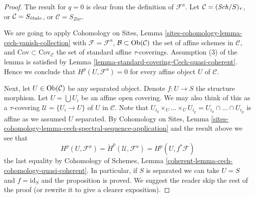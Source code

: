 \begin{proof}
The result for $q = 0$ is clear from the definition of $\mathcal{F}^a$.
Let $\mathcal{C} = (\mathit{Sch}/S)_\tau$, or $\mathcal{C} = S_{\acute{e}tale}$,
or $\mathcal{C} = S_{Zar}$.

\medskip\noindent
We are going to apply
Cohomology on Sites,
Lemma \ref{sites-cohomology-lemma-cech-vanish-collection}
with $\mathcal{F} = \mathcal{F}^a$,
$\mathcal{B} \subset \mathop{\mathrm{Ob}}\nolimits(\mathcal{C})$ the set of affine schemes
in $\mathcal{C}$, and $\text{Cov} \subset \text{Cov}_\mathcal{C}$ the
set of standard affine $\tau$-coverings. Assumption (3) of
the lemma is satisfied by
Lemma \ref{lemma-standard-covering-Cech-quasi-coherent}.
Hence we conclude that $H^p(U, \mathcal{F}^a) = 0$ for every
affine object $U$ of $\mathcal{C}$.

\medskip\noindent
Next, let $U \in \mathop{\mathrm{Ob}}\nolimits(\mathcal{C})$ be any separated object.
Denote $f : U \to S$ the structure morphism.
Let $U = \bigcup U_i$ be an affine open covering.
We may also think of this as a $\tau$-covering
$\mathcal{U} = \{U_i \to U\}$ of $U$ in $\mathcal{C}$.
Note that
$U_{i_0} \times_U \ldots \times_U U_{i_p} =
U_{i_0} \cap \ldots \cap U_{i_p}$ is affine as we assumed $U$ separated.
By
Cohomology on Sites, Lemma
\ref{sites-cohomology-lemma-cech-spectral-sequence-application}
and the result above we see that
$$
H^p(U, \mathcal{F}^a) = \check{H}^p(\mathcal{U}, \mathcal{F}^a)
= H^p(U, f^*\mathcal{F})
$$
the last equality by
Cohomology of Schemes, Lemma
\ref{coherent-lemma-cech-cohomology-quasi-coherent}.
In particular, if $S$ is separated we can take $U = S$ and
$f = \text{id}_S$ and the proposition is proved.
We suggest the reader skip the rest of the proof (or rewrite it
to give a clearer exposition).


\end{proof}
